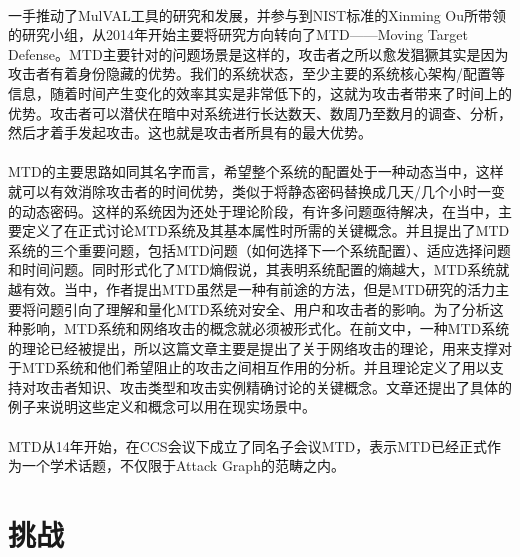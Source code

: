 \documentclass[12pt,a4paper]{article}
\begin{document}
\paragraph{}
一手推动了MulVAL工具\cite{8}\cite{9}的研究和发展，并参与到NIST标准\cite{1}的Xinming Ou所带领的研究小组，从2014年开始主要将研究方向转向了MTD——Moving Target Defense\cite{16}\cite{17}。MTD主要针对的问题场景是这样的，攻击者之所以愈发猖獗其实是因为攻击者有着身份隐藏的优势。我们的系统状态，至少主要的系统核心架构/配置等信息，随着时间产生变化的效率其实是非常低下的，这就为攻击者带来了时间上的优势。攻击者可以潜伏在暗中对系统进行长达数天、数周乃至数月的调查、分析，然后才着手发起攻击。这也就是攻击者所具有的最大优势。
\paragraph{}
MTD的主要思路如同其名字而言，希望整个系统的配置处于一种动态当中，这样就可以有效消除攻击者的时间优势，类似于将静态密码替换成几天/几个小时一变的动态密码。这样的系统因为还处于理论阶段，有许多问题亟待解决，在\cite{16}当中，主要定义了在正式讨论MTD系统及其基本属性时所需的关键概念。并且提出了MTD系统的三个重要问题，包括MTD问题（如何选择下一个系统配置）、适应选择问题和时间问题。同时形式化了MTD熵假说，其表明系统配置的熵越大，MTD系统就越有效。\cite{17}当中，作者提出MTD虽然是一种有前途的方法，但是MTD研究的活力主要将问题引向了理解和量化MTD系统对安全、用户和攻击者的影响。为了分析这种影响，MTD系统和网络攻击的概念就必须被形式化。在前文\cite{16}中，一种MTD系统的理论已经被提出，所以这篇文章主要是提出了关于网络攻击的理论，用来支撑对于MTD系统和他们希望阻止的攻击之间相互作用的分析。并且理论定义了用以支持对攻击者知识、攻击类型和攻击实例精确讨论的关键概念。文章还提出了具体的例子来说明这些定义和概念可以用在现实场景中。
\paragraph{}
MTD从14年开始，在CCS会议下成立了同名子会议MTD，表示MTD已经正式作为一个学术话题，不仅限于Attack Graph的范畴之内。

\section{挑战}
\end{document}
